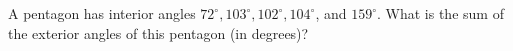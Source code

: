 A pentagon has interior angles $72^{\circ}, 103^{\circ}, 102^{\circ}, 104^{\circ}$, and $159^{\circ}$. What is the sum of the exterior angles of this pentagon (in degrees)?
